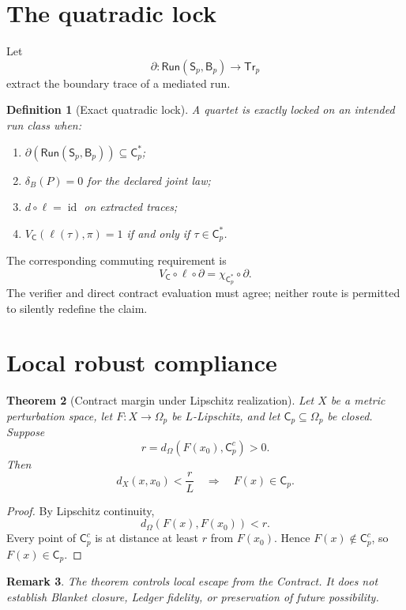 \documentclass[11pt]{article}
\newtheorem{definition}{Definition}[section]
\newtheorem{theorem}[definition]{Theorem}
\newtheorem{remark}[definition]{Remark}
\newcommand{\Contract}{\mathsf{C}}
\newcommand{\Script}{\mathsf{S}}
\newcommand{\Blanket}{\mathsf{B}}
\newcommand{\Tr}{\mathsf{Tr}}
\newcommand{\Run}{\mathsf{Run}}
\newcommand{\id}{\operatorname{id}}
\begin{document}
\section{The quatradic lock}

Let
\[
\partial:\Run(\Script_p,\Blanket_p)\to\Tr_p
\]
extract the boundary trace of a mediated run.

\begin{definition}[Exact quatradic lock]
A quartet is exactly locked on an intended run class when:
\begin{enumerate}[label=(\roman*)]
\item $\partial(\Run(\Script_p,\Blanket_p))\subseteq\Contract_p^*$;
\item $\delta_B(P)=0$ for the declared joint law;
\item $d\circ\ell=\id$ on extracted traces;
\item $V_{\Contract}(\ell(\tau),\pi)=1$ if and only if $\tau\in\Contract_p^*$.
\end{enumerate}
\end{definition}

The corresponding commuting requirement is
\[
V_{\Contract}\circ\ell\circ\partial
=
\chi_{\Contract_p^*}\circ\partial.
\]
The verifier and direct contract evaluation must agree; neither route is permitted to silently redefine the claim.

\section{Local robust compliance}

\begin{theorem}[Contract margin under Lipschitz realization]
Let $X$ be a metric perturbation space, let $F:X\to\Omega_p$ be $L$-Lipschitz, and let $\Contract_p\subseteq\Omega_p$ be closed. Suppose
\[
r=d_{\Omega}(F(x_0),\Contract_p^c)>0.
\]
Then
\[
d_X(x,x_0)<\frac{r}{L}
\quad\Longrightarrow\quad
F(x)\in\Contract_p.
\]
\end{theorem}

\begin{proof}
By Lipschitz continuity,
\[
d_{\Omega}(F(x),F(x_0))<r.
\]
Every point of $\Contract_p^c$ is at distance at least $r$ from $F(x_0)$. Hence $F(x)\notin\Contract_p^c$, so $F(x)\in\Contract_p$.
\end{proof}

\begin{remark}
The theorem controls local escape from the Contract. It does not establish Blanket closure, Ledger fidelity, or preservation of future possibility.
\end{remark}
\end{document}
